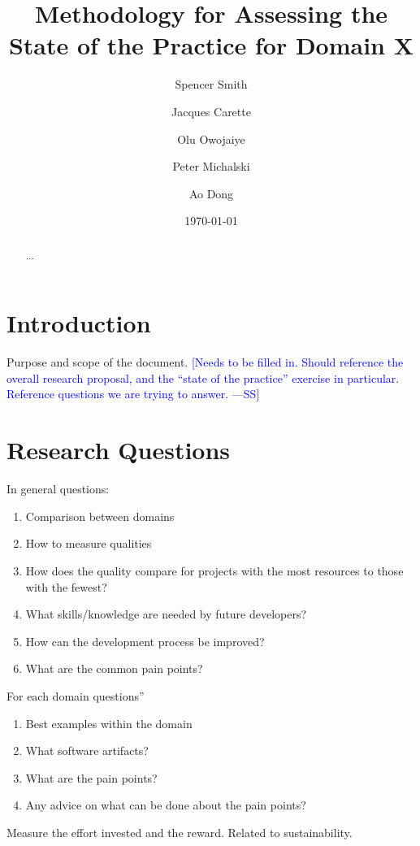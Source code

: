 \documentclass[letterpaper,cleveref]{lipics-v2019}
\title{Methodology for Assessing the State of the Practice for Domain X}
\author{Spencer Smith}{McMaster University, Canada}{smiths@mcmaster.ca}{}{}
\author{Jacques Carette}{McMaster University, Canada}{carette@mcmaster.ca}{}{}
\author{Olu Owojaiye}{McMaster University, Canada}{owojaiyo@mcmaster.ca}{}{}
\author{Peter Michalski}{McMaster University, Canada}{michap@mcmaster.ca}{}{}
\author{Ao Dong}{McMaster University, Canada}{donga9@mcmaster.ca}{}{}
\date{\today}
\newcommand{\authornote}[3]{\textcolor{#1}{[#3 ---#2]}}
\newcommand{\authornote}[3]{}
\newcommand{\wss}[1]{\authornote{blue}{SS}{#1}} %
\theoremstyle{definition}
\begin{document}
\maketitle

\begin{abstract}
	...
\end{abstract}

\tableofcontents

\section{Introduction} \label{SecIntroduction}

Purpose and scope of the document.  \wss{Needs to be filled in.  Should
	reference the overall research proposal, and the ``state of the practice''
	exercise in particular.  Reference questions we are trying to answer.}

\section{Research Questions}\label{ResearchQuestions}

In general questions:

\begin{enumerate}
\item Comparison between domains
\item How to measure qualities
\item How does the quality compare for projects with the most resources to those
  with the fewest?
\item What skills/knowledge are needed by future developers?
\item How can the development process be improved?
\item What are the common pain points?
\end{enumerate}

For each domain questions''

\begin{enumerate}
\item Best examples within the domain
\item What software artifacts?
\item What are the pain points?
\item Any advice on what can be done about the pain points?
\end{enumerate}

Measure the effort invested and the reward.  Related to sustainability.
\end{document}
